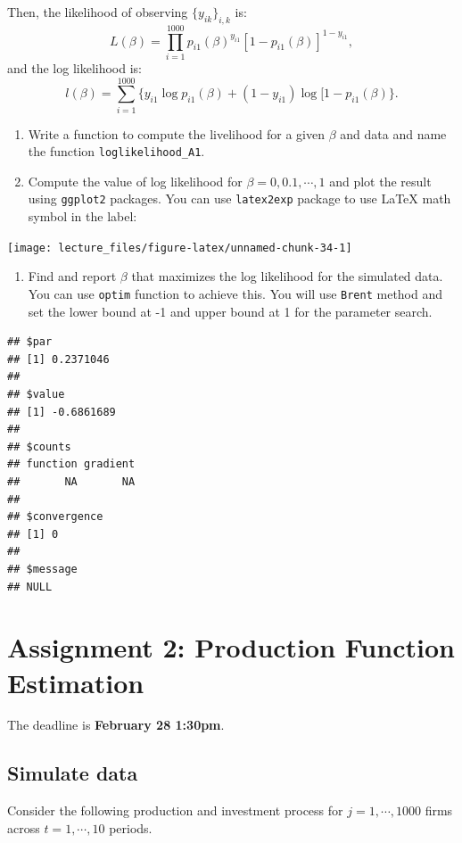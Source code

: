 \documentclass[]{book}
\providecommand{\tightlist}{%
  \setlength{\itemsep}{0pt}\setlength{\parskip}{0pt}}
\begin{document}
Then, the likelihood of observing \(\{y_{ik}\}_{i, k}\) is: \[
L(\beta) = \prod_{i = 1}^{1000} p_{i1}(\beta)^{y_{i1}} [1 - p_{i1}(\beta)]^{1 - y_{i1}},
\] and the log likelihood is: \[
l(\beta) = \sum_{i = 1}^{1000}\{y_{i1}\log p_{i1}(\beta) + (1 - y_{i1})\log [1 - p_{i1}(\beta)\}.
\]

\begin{enumerate}
\def\labelenumi{\arabic{enumi}.}
\item
  Write a function to compute the livelihood for a given \(\beta\) and
  data and name the function \texttt{loglikelihood\_A1}.
\item
  Compute the value of log likelihood for \(\beta = 0, 0.1, \cdots, 1\)
  and plot the result using \texttt{ggplot2} packages. You can use
  \texttt{latex2exp} package to use LaTeX math symbol in the label:
\end{enumerate}

\begin{center}\texttt{[image: lecture\_files/figure-latex/unnamed-chunk-34-1]} \end{center}

\begin{enumerate}
\def\labelenumi{\arabic{enumi}.}
\tightlist
\item
  Find and report \(\beta\) that maximizes the log likelihood for the
  simulated data. You can use \texttt{optim} function to achieve this.
  You will use \texttt{Brent} method and set the lower bound at -1 and
  upper bound at 1 for the parameter search.
\end{enumerate}

\begin{verbatim}
## $par
## [1] 0.2371046
## 
## $value
## [1] -0.6861689
## 
## $counts
## function gradient 
##       NA       NA 
## 
## $convergence
## [1] 0
## 
## $message
## NULL
\end{verbatim}

\chapter{Assignment 2: Production Function
Estimation}\label{assignment2}

The deadline is \textbf{February 28 1:30pm}.

\section{Simulate data}\label{simulate-data-1}

Consider the following production and investment process for
\(j = 1, \cdots, 1000\) firms across \(t = 1, \cdots, 10\) periods.
\end{document}
